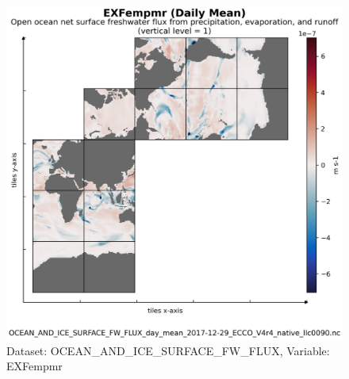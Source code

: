 \begin{figure}[H]
\centering
\includegraphics[scale=0.55]{../images/plots/v4r4/native_plots/Ocean_and_Sea-Ice_Surface_Freshwater_Fluxes/EXFempmr.png}
\caption{Dataset: OCEAN\_AND\_ICE\_SURFACE\_FW\_FLUX, Variable: EXFempmr}
\label{tab:table-OCEAN_AND_ICE_SURFACE_FW_FLUX_EXFempmr-Plot}
\end{figure}
\newpage
\pagebreak
